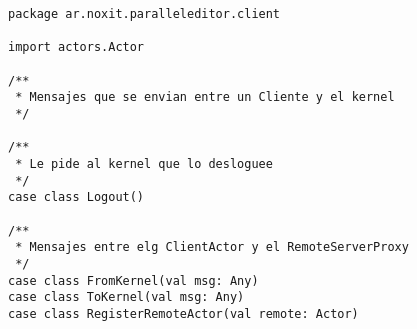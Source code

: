 {
\tiny
\begin{verbatim}
package ar.noxit.paralleleditor.client

import actors.Actor

/**
 * Mensajes que se envian entre un Cliente y el kernel
 */

/**
 * Le pide al kernel que lo desloguee
 */
case class Logout()

/**
 * Mensajes entre elg ClientActor y el RemoteServerProxy
 */
case class FromKernel(val msg: Any)
case class ToKernel(val msg: Any)
case class RegisterRemoteActor(val remote: Actor)

\end{verbatim}
}
